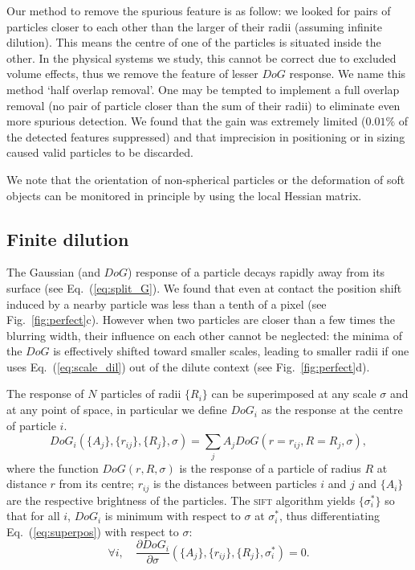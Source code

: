 \documentclass[8.5pt,twoside,twocolumn]{article}
\begin{document}
Our method to remove the spurious feature is as follow: we looked for pairs of particles closer to each other than the larger of their radii (assuming infinite dilution). This means the centre of one of the particles is situated inside the other. In the physical systems we study, this cannot be correct due to excluded volume effects, thus we remove the feature of lesser $DoG$ response. We name this method `half overlap removal'. One may be tempted to implement a full overlap removal (no pair of particle closer than the sum of their radii) to eliminate even more spurious detection. We found that the gain was extremely limited ($0.01\%$ of the detected features suppressed) and that imprecision in positioning or in sizing caused valid particles to be discarded.

We note that the orientation of non-spherical particles or the deformation of soft objects can be monitored in principle by using the local Hessian matrix.

\subsection{Finite dilution}
The Gaussian (and $DoG$) response of a particle decays rapidly away from its surface (see Eq.~(\ref{eq:split_G}). We found that even at contact the position shift induced by a nearby particle was less than a tenth of a pixel (see Fig.~\ref{fig:perfect}c). However when two particles are closer than a few times the blurring width, their influence on each other cannot be neglected: the minima of the $DoG$ is effectively shifted toward smaller scales, leading to smaller radii if one uses Eq.~(\ref{eq:scale_dil}) out of the dilute context (see Fig.~\ref{fig:perfect}d).

The response of $N$ particles of radii $\lbrace R_i\rbrace$ can be superimposed at any scale $\sigma$ and at any point of space, in particular we define $DoG_i$ as the response at the centre of particle $i$.
\begin{equation}
DoG_i(\lbrace A_j\rbrace, \lbrace r_{ij}\rbrace, \lbrace R_j\rbrace, \sigma) = \sum_j A_j DoG(r=r_{ij}, R=R_j, \sigma),
\label{eq:superpos}
\end{equation}
where the function $DoG(r,R,\sigma)$ is the response of a particle of radius $R$ at distance $r$ from its centre; $r_{ij}$ is the distances between particles $i$ and $j$ and $\lbrace A_i\rbrace$ are the respective brightness of the particles. The \textsc{sift} algorithm yields $\lbrace \sigma_i^*\rbrace$ so that for all $i$, $DoG_i$ is minimum with respect to $\sigma$ at $\sigma_i^*$, thus differentiating Eq.~(\ref{eq:superpos}) with respect to $\sigma$:
\begin{equation}
\forall i,\quad \frac{\partial DoG_i}{\partial\sigma}(\lbrace A_j\rbrace, \lbrace r_{ij}\rbrace, \lbrace R_j\rbrace, \sigma_i^*) = 0.
\label{eq:DoG_min}
\end{equation}
\end{document}
